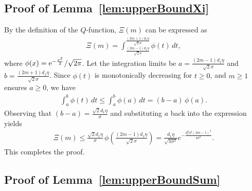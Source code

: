 \documentclass[journal,12pt,onecolumn,draftclsnofoot]{IEEEtran}
\theoremstyle{definition}
\begin{document}
\subsection{Proof of Lemma~\ref{lem:upperBoundXi}}\label{Ap:lem:upperBoundXi}

By the definition of the \(Q\)-function, $\Xi(m)$ can be expressed as
\begin{align}
    \Xi(m) 
    = \int_{\tfrac{(2m-1)d_1 \eta}{\sqrt{2}\sigma}}^{\tfrac{(2m+1)d_1 \eta}{\sqrt{2}\sigma}} 
    \phi(t)\,dt, 
\end{align}
where $ \phi(x) =  {\rm e}^{-\frac{x^2}{2}}/{\sqrt{2\pi}}$.  Let the integration limits be 
\( a = \tfrac{(2m-1)d_1 \eta}{\sqrt{2}\sigma} \) 
and 
\( b = \tfrac{(2m+1)d_1 \eta}{\sqrt{2}\sigma} \).  
Since $\phi(t)$ is monotonically decreasing for $t \ge 0$, and $m \ge 1$ ensures $a \ge 0$, we have
\begin{align}
    \int_{a}^{b} \phi(t)\,dt 
    \leq \int_{a}^{b} \phi(a)\,dt 
    = (b - a)\,\phi(a).
\end{align}
Observing that \((b - a) = \tfrac{\sqrt{2} d_1 \eta}{\sigma}\) and substituting $a$ back into the expression yields
\begin{align}
    \Xi(m) 
    \leq 
    \frac{\sqrt{2} d_1 \eta}{\sigma} 
    \, \phi\!\left(\frac{(2m - 1)d_1 \eta}{\sqrt{2}\sigma}\right)
    = \frac{ d_1 \eta}{\sqrt{\pi \sigma^2}} 
      e^{-\tfrac{d_1^2 \eta^2 (2m - 1)^2}{4\sigma^2}}.
\end{align}
This completes the proof.



\subsection{Proof of Lemma~\ref{lem:upperBoundSum}}\label{Ap:upperBoundSum}
\end{document}
